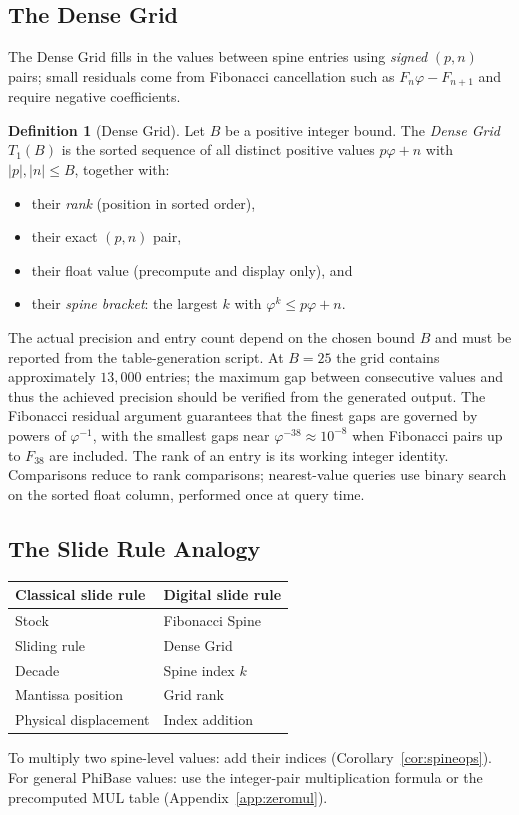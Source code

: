 \documentclass[12pt]{article}
\theoremstyle{definition}
\newtheorem{definition}[theorem]{Definition}
\theoremstyle{remark}
\begin{document}
\subsection{The Dense Grid}
\label{sec:densegrid}
The Dense Grid fills in the values between spine entries using
\emph{signed} $(p,n)$ pairs; small residuals come from Fibonacci
cancellation such as $F_n\varphi - F_{n+1}$ and require negative
coefficients.
\begin{definition}[Dense Grid]
Let $B$ be a positive integer bound.  The \emph{Dense Grid} $T_1(B)$
is the sorted sequence of all distinct positive values
$p\varphi+n$ with $|p|,|n|\leq B$, together with:
\begin{itemize}[nosep]
  \item their \emph{rank} (position in sorted order),
  \item their exact $(p,n)$ pair,
  \item their float value (precompute and display only), and
  \item their \emph{spine bracket}: the largest $k$ with
        $\varphi^k\leq p\varphi+n$.
\end{itemize}
\end{definition}
The actual precision and entry count depend on the chosen bound $B$
and must be reported from the table-generation script.  At $B=25$
the grid contains approximately $13{,}000$ entries; the maximum gap
between consecutive values and thus the achieved precision should be
verified from the generated output.  The Fibonacci residual argument
guarantees that the finest gaps are governed by powers of $\varphi^{-1}$,
with the smallest gaps near $\varphi^{-38}\approx10^{-8}$ when
Fibonacci pairs up to $F_{38}$ are included.
The rank of an entry is its working integer identity.  Comparisons
reduce to rank comparisons; nearest-value queries use binary search
on the sorted float column, performed once at query time.
\subsection{The Slide Rule Analogy}
\begin{center}
\renewcommand{\arraystretch}{1.3}
\begin{tabular}{ll}
\toprule
Classical slide rule & Digital slide rule \\
\midrule
Stock & Fibonacci Spine \\
Sliding rule & Dense Grid \\
Decade & Spine index $k$ \\
Mantissa position & Grid rank \\
Physical displacement & Index addition \\
\bottomrule
\end{tabular}
\end{center}
To multiply two spine-level values: add their indices
(Corollary~\ref{cor:spineops}).  For general PhiBase values: use the
integer-pair multiplication formula or the precomputed MUL table
(Appendix~\ref{app:zeromul}).
\end{document}
